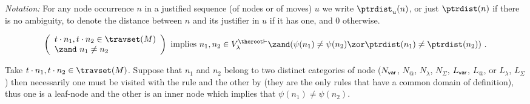 \emph{Notation:} For any node occurrence $n$ in a justified sequence
(of nodes or of moves) $u$ we write $\ptrdist_u(n)$, or just
$\ptrdist(n)$ if there is no ambiguity, to denote the distance
between $n$ and its justifier in $u$ if it has one, and $0$
otherwise.

\begin{lemma}
\label{lem:varphiinjective:prelem}
\begin{equation*}
\left(
  \begin{array}{ll}
    t \cdot n_1, t \cdot n_2 \in \travset(M) \\
    \zand\ n_1 \neq n_2
  \end{array}
\right)
 \mbox{ implies } n_1,n_2 \in V^{\theroot\vdash}_{\lambda} \zand ( \psi(n_1) \neq \psi(n_2) \zor \ptrdist(n_1) \neq \ptrdist(n_2) ) \ .
 \end{equation*}
\end{lemma}
\proof Take $t \cdot n_1, t \cdot n_2 \in \travset(M)$. Suppose that
$n_1$ and $n_2$ belong to two distinct categories of node ($N_{\sf
var}$, $N_@$, $N_\lambda$, $N_\Sigma$, $L_{\sf var}$, $L_@$, or $L_\lambda$, $L_\Sigma$)
then necessarily one must be visited with the rule
 and the other by  (they are
the only rules that have a common domain of definition), thus one is
a leaf-node and the other is an inner node which implies that
$\psi(n_1) \neq \psi(n_2)$.


